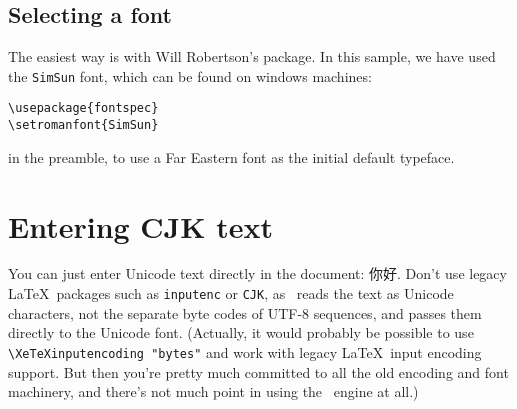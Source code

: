 \subsection{Selecting a font}

The easiest way is with Will Robertson's  package. In this sample, we have used the \texttt{SimSun} font, which can be found on windows machines:

\begin{verbatim}
\usepackage{fontspec}
\setromanfont{SimSun}
\end{verbatim}
in the preamble, to use a Far Eastern font as the initial default typeface.

\section{Entering CJK text}

You can just enter Unicode text directly in the document: 你好. Don't use legacy \LaTeX\ packages such as \verb|inputenc| or \verb|CJK|, as \XeTeX\ reads the text as Unicode characters, not the separate byte codes of UTF-8 sequences, and passes them directly to the Unicode font. (Actually, it would probably be possible to use \verb|\XeTeXinputencoding "bytes"| and work with legacy \LaTeX\ input encoding support. But then you're pretty much committed to all the old encoding and font machinery, and there's not much point in using the \XeTeX\ engine at all.)

\begin{comment}
\setromanfont{Times New Roman}

\subsection{A CJK environment}

\newenvironment{CJK}{\fontspec[Scale=0.9]{SimSun}}{}

\newcommand{\cjk}[1]{{\fontspec[Scale=0.9]{SimSun}#1}}

Rather than selecting a CJK font as the main document typeface, you might want to define a CJK environment for text fragments used in the midst of a document using a normal Roman font. This allows me to say \verb|\begin{CJK}東光\end{CJK}| to generate \begin{CJK}東光\end{CJK}, without putting the whole paragraph into the Far Eastern font. Or I could define a command that takes the CJK text as an argument, so that \verb|\cjk{北京}| produces \cjk{北京}. It's that easy! Such an environment can easily be set using the \cmd{newfamily} or \cmd{\fontspec}.

\begin{verbatim}
\newenvironment{CJK}{\fontspec[Scale=0.9]{SimSun}}{}
\newcommand{\cjk}[1]{{\fontspec[Scale=0.9]{SimSun}#1}}
\end{verbatim}
\end{comment}



